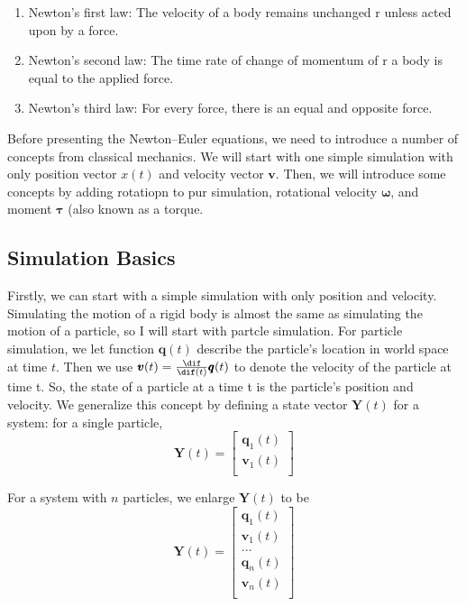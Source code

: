 \begin{enumerate}
    \item Newton’s first law: The velocity of a body remains unchanged r unless acted upon by a force.
    \item Newton’s second law: The time rate of change of momentum of r a body is equal to the applied force.
    \item Newton’s third law: For every force, there is an equal and opposite force.
\end{enumerate}

Before presenting the Newton–Euler equations, we need to introduce a number of concepts from classical mechanics. We will start with one simple simulation with only position vector $x(t)$ and velocity vector $\pmb{v}$. Then, we will introduce some concepts by adding rotatiopn to pur simulation, rotational velocity $\pmb{\omega}$, and moment $\pmb{\tau}$ (also known as a torque.


\subsection{Simulation Basics}

Firstly, we can start with a simple simulation with only position and velocity. Simulating the motion of a rigid body is almost the same as simulating the motion of a particle, so I will start with partcle simulation. For particle simulation, we let function $\pmb{q}(t)$ describe the particle's location in world space at time $t$. Then we use $\pmb{v}(t)=\frac{\dif}{\dif(t)}\pmb{q}(t)$
to denote the velocity of the particle at time t. So, the state of a particle at a time t is the particle's position and velocity. We generalize this concept by defining a state vector $\textbf{Y}(t)$ for a system: for a single particle,
\begin{equation}
    \textbf{Y}(t) = \left[
        \begin{array}{c}
            \pmb{q}_{1}(t) \\
            \pmb{v}_{1}(t) \\
        \end{array}
    \right]
\end{equation}

For a system with $n$ particles, we enlarge $\textbf{Y}(t)$ to be
\begin{equation}
    \textbf{Y}(t) = \left[
    \begin{array}{c}
        \pmb{q}_{1}(t) \\
        \pmb{v}_{1}(t) \\
        ... \\
        \pmb{q}_{n}(t) \\
        \pmb{v}_{n}(t) \\
    \end{array}
    \right]
\end{equation}

